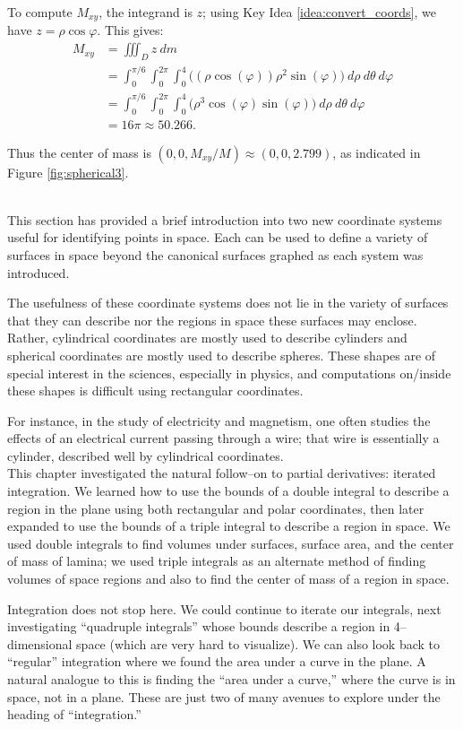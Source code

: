 {To compute $M_{xy}$, the integrand is $z$; using Key Idea \ref{idea:convert_coords}, we have $z = \rho\cos\varphi$. This gives:
\begin{align*}
M_{xy} &= \iiint_D z\ dm \\
	&= \int_0^{\pi/6}\int_0^{2\pi}\int_0^4 \big((\rho\cos(\varphi))\rho^2\sin(\varphi)\big) \ d\rho\ d\theta\ d\varphi\\
	&= \int_0^{\pi/6}\int_0^{2\pi}\int_0^4 \big(\rho^3\cos(\varphi)\sin(\varphi)\big) \ d\rho\ d\theta\ d\varphi\\
	&=16\pi \approx 50.266.
\end{align*}

Thus the center of mass is $(0,0,M_{xy}/M) \approx (0,0,2.799)$, as indicated in Figure \ref{fig:spherical3}. 
}\\

This section has provided a brief introduction into two new coordinate systems useful for identifying points in space. Each can be used to define a variety of surfaces in space beyond the canonical surfaces graphed as each system was introduced.

The usefulness of these coordinate systems does not lie in the variety of surfaces that they can describe nor the regions in space these surfaces may enclose. Rather,  cylindrical coordinates are mostly used to describe cylinders and spherical coordinates are mostly used to describe spheres. These shapes are of special interest in the sciences, especially in physics, and computations on/inside these shapes is difficult using rectangular coordinates.

For instance, in the study of electricity and magnetism, one often studies the effects of an electrical current passing through a wire; that wire is essentially a cylinder, described well by cylindrical coordinates. \\

This chapter investigated the natural follow--on to partial derivatives: iterated integration. We learned how to use the bounds of a double integral to describe a region in the plane using both rectangular and polar coordinates, then later expanded to use the bounds of a triple integral to describe a region in space. We used double integrals to find volumes under surfaces, surface area, and the center of mass of lamina; we used triple integrals as an alternate method of finding volumes of space regions and also to find the center of mass of a region in space.

Integration does not stop here. We could continue to iterate our integrals, next investigating ``quadruple integrals'' whose bounds describe a region in 4--dimensional space (which are very hard to visualize). We can also look back to ``regular'' integration where we found the area under a curve in the plane. A natural analogue to this is finding the ``area under a curve,'' where the curve is in space, not in a plane. These are just two of many avenues to explore under the heading of ``integration.''



